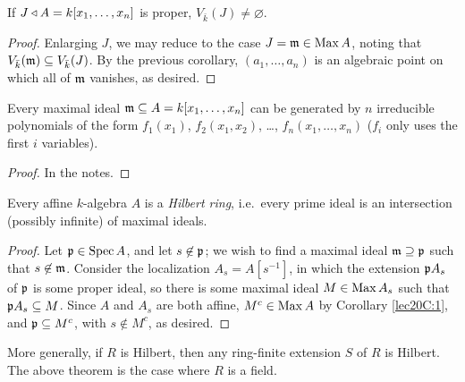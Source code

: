  \begin{corollary}
   If $J\triangleleft A=k[x_1,\dots, x_n]$ is proper, $V_{\bar k}(J)\neq \varnothing$.
 \end{corollary}
 \begin{proof}
   Enlarging $J$, we may reduce to the case $J=\mathfrak{m}\in \operatorname{Max} A$, noting that $V_{\bar
   k}(\mathfrak{m})\subseteq V_{\bar k}(J)$. By the previous corollary, $(a_1,\dots, a_n)$ is an
   algebraic point on which all of $\mathfrak{m}$ vanishes, as desired.
 \end{proof}
 \begin{corollary}
   Every maximal ideal $\mathfrak{m}\subseteq A=k[x_1,\dots, x_n]$ can be generated by $n$
   irreducible polynomials of the form $f_1(x_1)$, $f_2(x_1,x_2)$, \dots, $f_n(x_1,\dots,
   x_n)$ ($f_i$ only uses the first $i$ variables).
 \end{corollary}
 \begin{proof}
   In the notes. \anton{}
 \end{proof}
 \begin{theorem}
   Every affine $k$-algebra $A$ is a \emph{Hilbert ring}, i.e.\ every prime ideal is an
   intersection (possibly infinite) of maximal ideals.
 \end{theorem}
 \begin{proof}
   Let $\mathfrak{p}\in \operatorname{Spec} A$, and let $s\not\in \mathfrak{p}$; we wish to find a maximal ideal
   $\mathfrak{m}\supseteq \mathfrak{p}$ such that $s\not\in \mathfrak{m}$. Consider the localization $A_s=A[s^{-1}]$,
   in which the extension $\mathfrak{p} A_s$ of $\mathfrak{p}$ is some proper ideal, so there is some maximal
   ideal $M\in \operatorname{Max} A_s$ such that $\mathfrak{p} A_s\subseteq M$. Since $A$ and $A_s$ are both
   affine, $M^c\in \operatorname{Max} A$ by Corollary \ref{lec20C:1}, and $\mathfrak{p}\subseteq M^c$, with
   $s\not\in M^c$, as desired.
 \end{proof}
 More generally, if $R$ is Hilbert, then any ring-finite extension $S$ of $R$ is Hilbert.
 The above theorem is the case where $R$ is a field.
